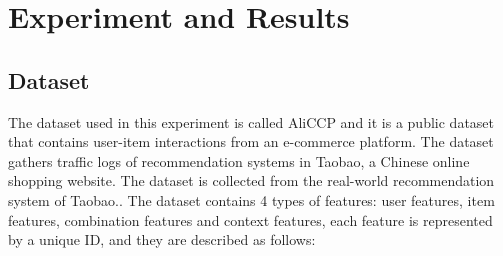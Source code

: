 \chapter{Experiment and Results}
\minitoc

\section{Dataset}

The dataset used in this experiment is called AliCCP and it is a public dataset that contains user-item interactions from an e-commerce platform. The dataset gathers traffic logs of recommendation systems in Taobao, a Chinese online shopping website. The dataset is collected from the real-world recommendation system of Taobao.\cite{AliCPP}. The dataset contains 4 types of features: user features, item features, combination features and context features, each feature is represented by a unique ID, and they are described as follows:

